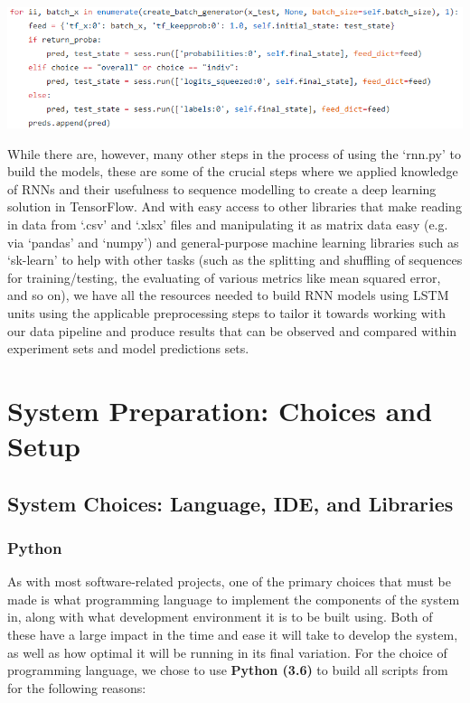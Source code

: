 \documentclass[12pt,twoside]{report}
\begin{document}
\begin{itemize}
\begin{center}
\includegraphics[scale=0.6]{project_figures/fig3_17}
\end{center}
\end{itemize}

\quad While there are, however, many other steps in the process of using the ‘rnn.py’ to build the models, these are some of the crucial steps where we applied knowledge of RNNs and their usefulness to sequence modelling to create a deep learning solution in TensorFlow. And with easy access to other libraries that make reading in data from ‘.csv’ and ‘.xlsx’ files and manipulating it as matrix data easy (e.g. via ‘pandas’ and ‘numpy’) and general-purpose machine learning libraries such as ‘sk-learn’ to help with other tasks (such as the splitting and shuffling of sequences for training/testing, the evaluating of various metrics like mean squared error, and so on), we have all the resources needed to build RNN models using LSTM units using the applicable preprocessing steps to tailor it towards working with our data pipeline and produce results that can be observed and compared within experiment sets and model predictions sets.




\part{System Preparation: Choices and Setup}


\chapter{System Choices: Language, IDE, and Libraries\\}


\section{Python}

\quad As with most software-related projects, one of the primary choices that must be made is what programming language to implement the components of the system in, along with what development environment it is to be built using. Both of these have a large impact in the time and ease it will take to develop the system, as well as how optimal it will be running in its final variation. For the choice of programming language, we chose to use \textbf{Python (3.6)} to build all scripts from for the following reasons:
\end{document}
